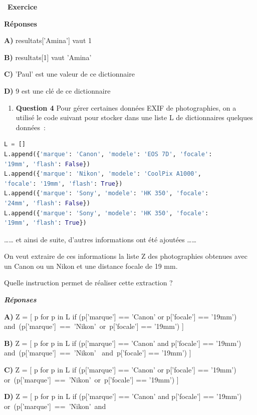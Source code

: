 \documentclass[
  11pt,
]{article}
\providecommand{\tightlist}{%
  \setlength{\itemsep}{0pt}\setlength{\parskip}{0pt}}
\newcounter{exo}
\newenvironment{exercice}[1]
{\par \medskip   \addtocounter{exo}{1} \noindent  
\begin{bclogo}[arrondi =0.1,   noborder = true, logo=\bccrayon, marge=4]{~\textbf{Exercice} \textbf{\theexo} {\itshape #1} }  \par}
{
\end{bclogo}
 \par \bigskip }
\newcounter{rque}
\newcounter{def}
\begin{document}
\begin{exercice}{}
\textbf{Réponses}

\textbf{A)} resultats{[}'Amina'{]} vaut 1

\textbf{B)} resultats{[}1{]} vaut 'Amina'

\textbf{C)} 'Paul' est une valeur de ce dictionnaire

\textbf{D)} 9 est une clé de ce dictionnaire

\begin{enumerate}
\def\labelenumi{\arabic{enumi}.}
\setcounter{enumi}{3}
\tightlist
\item
  \textbf{Question 4} Pour gérer certaines données EXIF de
  photographies, on a utilisé le code suivant pour stocker dans une
  liste L de dictionnaires quelques données~:
\end{enumerate}

\begin{lstlisting}[language=Python]
L = []
L.append({'marque': 'Canon', 'modele': 'EOS 7D', 'focale':
'19mm', 'flash': False})
L.append({'marque': 'Nikon', 'modele': 'CoolPix A1000',
'focale': '19mm', 'flash': True})
L.append({'marque': 'Sony', 'modele': 'HK 350', 'focale':
'24mm', 'flash': False})
L.append({'marque': 'Sony', 'modele': 'HK 350', 'focale':
'19mm', 'flash': True})
\end{lstlisting}

\ldots\ldots{} et ainsi de suite, d'autres informations ont été ajoutées
\ldots\ldots{}

On veut extraire de ces informations la liste Z des photographies
obtenues avec un Canon ou un Nikon et une distance focale de 19 mm.

Quelle instruction permet de réaliser cette extraction ?

\textbf{\emph{Réponses}}

\textbf{A)} Z = {[} p for p in L if (p{[}'marque'{]} == 'Canon' or
p{[}'focale'{]} == '19mm')
and~(p{[}'marque'{]}~==~'Nikon'~or~p{[}'focale'{]} == '19mm') {]}

\textbf{B)} Z = {[} p for p in L if (p{[}'marque'{]} == 'Canon' and
p{[}'focale'{]} == '19mm') and~(p{[}'marque'{]}~==~'Nikon'
~and~p{[}'focale'{]} == '19mm') {]}

\textbf{C)} Z = {[} p for p in L if (p{[}'marque'{]} == 'Canon' or
p{[}'focale'{]} == '19mm')
or~(p{[}'marque'{]}~==~'Nikon'~or~p{[}'focale'{]} == '19mm') {]}

\textbf{D)} Z = {[} p for p in L if (p{[}'marque'{]} == 'Canon' and
p{[}'focale'{]} == '19mm') or~(p{[}'marque'{]}~==~'Nikon'~and~


\end{exercice}
\end{document}

